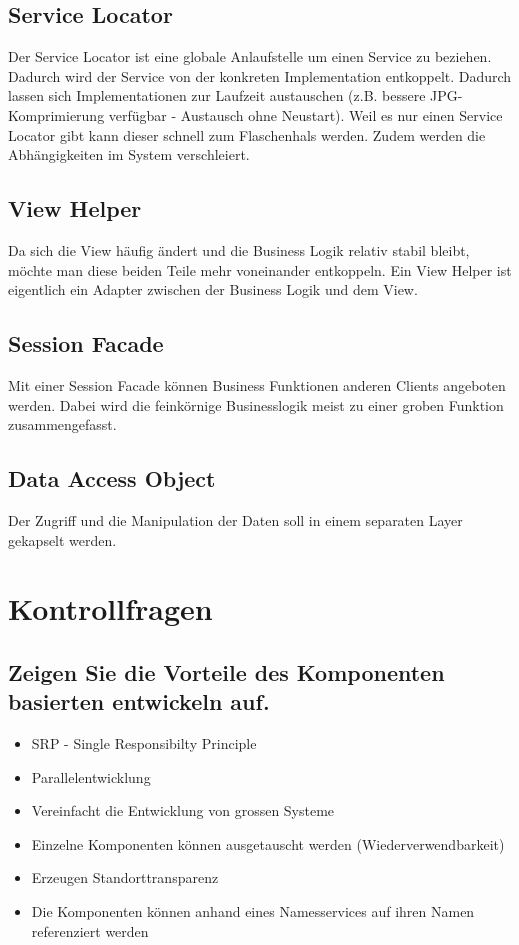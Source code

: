 \subsection{Service Locator}

Der Service Locator ist eine globale Anlaufstelle um einen Service zu beziehen. Dadurch wird der Service von der konkreten Implementation entkoppelt. Dadurch lassen sich Implementationen zur Laufzeit austauschen (z.B. bessere JPG-Komprimierung verfügbar - Austausch ohne Neustart). Weil es nur einen Service Locator gibt kann dieser schnell zum Flaschenhals werden. Zudem werden die Abhängigkeiten im System verschleiert.

\subsection{View Helper}

Da sich die View häufig ändert und die Business Logik relativ stabil bleibt, möchte man diese beiden Teile mehr voneinander entkoppeln. Ein View Helper ist eigentlich ein Adapter zwischen der Business Logik und dem View.

\subsection{Session Facade}

Mit einer Session Facade können Business Funktionen anderen Clients angeboten werden. Dabei wird die feinkörnige Businesslogik meist zu einer groben Funktion zusammengefasst.

\subsection{Data Access Object}

Der Zugriff und die Manipulation der Daten soll in einem separaten Layer gekapselt werden. 

\section{Kontrollfragen}

\subsection{Zeigen Sie die Vorteile des Komponenten basierten entwickeln auf.}
\begin{itemize}
	\item SRP - Single Responsibilty Principle
	\item Parallelentwicklung
	\item Vereinfacht die Entwicklung von grossen Systeme
	\item Einzelne Komponenten können ausgetauscht werden (Wiederverwendbarkeit)
	\item Erzeugen Standorttransparenz
	\item Die Komponenten können anhand eines Namesservices auf ihren Namen referenziert werden
\end{itemize}

